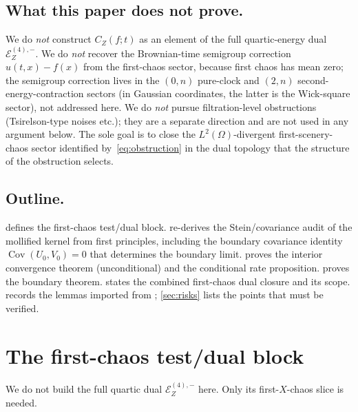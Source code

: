 \documentclass[11pt,reqno]{amsart}
\theoremstyle{plain}
\theoremstyle{definition}
\theoremstyle{remark}
\newcommand{\Energy}{\mathcal{E}}
\newcommand{\IBM}{Z}
\DeclareMathOperator{\Cov}{Cov}
\begin{document}
\subsection*{What this paper does not prove.}\label{sec:not}
We do \emph{not} construct $C_{\IBM}(f;t)$ as an element of the full
quartic-energy dual $\Energy_{\IBM}^{(4),-}$. We do \emph{not}
recover the Brownian-time semigroup correction $u(t,x)-f(x)$ from
the first-chaos sector, because first chaos has mean zero; the
semigroup correction lives in the $(0,n)$ pure-clock and
$(2,n)$ second-energy-contraction sectors (in Gaussian coordinates,
the latter is the Wick-square sector), not addressed here. We do \emph{not} pursue
filtration-level obstructions (Tsirelson-type noises etc.); they are
a separate direction and are not used in any argument below. The
sole goal is to close the $L^{2}(\Omega)$-divergent first-scenery-chaos
sector identified by~\eqref{eq:obstruction} in the dual topology
that the structure of the obstruction selects.

\subsection*{Outline.}
 defines the first-chaos test/dual block.
 re-derives the Stein/covariance audit of the
mollified kernel from first principles, including the boundary
covariance identity $\Cov(U_{0},V_{0})=0$ that determines the
boundary limit.  proves the interior convergence
theorem (unconditional) and the conditional rate proposition.
 proves the boundary theorem.
 states the combined first-chaos dual closure and
its scope.  records the lemmas imported from
\cite{Fontes-EnergyFirst}; \cref{sec:risks} lists the points that
must be verified.

\section{The first-chaos test/dual block}\label{sec:test-dual}

We do not build the full quartic dual $\Energy_{\IBM}^{(4),-}$ here.
Only its first-$X$-chaos slice is needed.
\end{document}
